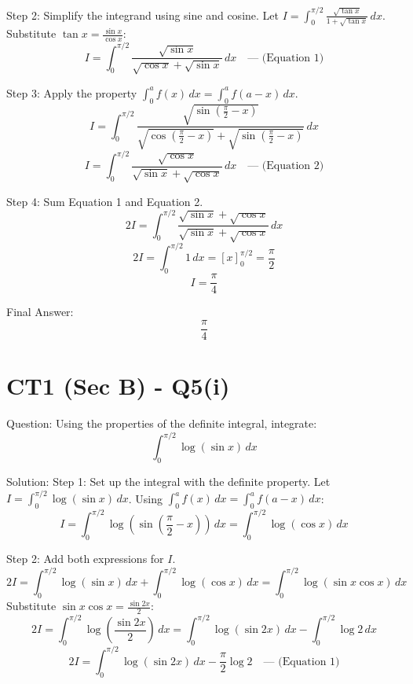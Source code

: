 \documentclass{article}
\begin{document}
Step 2: Simplify the integrand using sine and cosine.
Let \(I = \int_0^{\pi/2} \frac{\sqrt{\tan x}}{1 + \sqrt{\tan x}} \, dx\).
Substitute \(\tan x = \frac{\sin x}{\cos x}\):
\[
I = \int_0^{\pi/2} \frac{\sqrt{\sin x}}{\sqrt{\cos x} + \sqrt{\sin x}} \, dx \quad \text{--- (Equation 1)}
\]

Step 3: Apply the property \(\int_0^a f(x) \, dx = \int_0^a f(a-x) \, dx\).
\[
I = \int_0^{\pi/2} \frac{\sqrt{\sin\left(\frac{\pi}{2}-x\right)}}{\sqrt{\cos\left(\frac{\pi}{2}-x\right)} + \sqrt{\sin\left(\frac{\pi}{2}-x\right)}} \, dx
\]
\[
I = \int_0^{\pi/2} \frac{\sqrt{\cos x}}{\sqrt{\sin x} + \sqrt{\cos x}} \, dx \quad \text{--- (Equation 2)}
\]

Step 4: Sum Equation 1 and Equation 2.
\[
2I = \int_0^{\pi/2} \frac{\sqrt{\sin x} + \sqrt{\cos x}}{\sqrt{\sin x} + \sqrt{\cos x}} \, dx
\]
\[
2I = \int_0^{\pi/2} 1 \, dx = \left[ x \right]_0^{\pi/2} = \frac{\pi}{2}
\]
\[
I = \frac{\pi}{4}
\]

Final Answer:
\[
\boxed{\frac{\pi}{4}}
\]

\section*{CT1 (Sec B) - Q5(i)}
Question:
Using the properties of the definite integral, integrate:
\[
\int_0^{\pi/2} \log(\sin x) \, dx
\]

Solution:
Step 1: Set up the integral with the definite property.
Let \(I = \int_0^{\pi/2} \log(\sin x) \, dx\).
Using \(\int_0^a f(x) \, dx = \int_0^a f(a-x) \, dx\):
\[
I = \int_0^{\pi/2} \log\left(\sin\left(\frac{\pi}{2}-x\right)\right) \, dx = \int_0^{\pi/2} \log(\cos x) \, dx
\]

Step 2: Add both expressions for \(I\).
\[
2I = \int_0^{\pi/2} \log(\sin x) \, dx + \int_0^{\pi/2} \log(\cos x) \, dx = \int_0^{\pi/2} \log(\sin x \cos x) \, dx
\]
Substitute \(\sin x \cos x = \frac{\sin 2x}{2}\):
\[
2I = \int_0^{\pi/2} \log\left(\frac{\sin 2x}{2}\right) \, dx = \int_0^{\pi/2} \log(\sin 2x) \, dx - \int_0^{\pi/2} \log 2 \, dx
\]
\[
2I = \int_0^{\pi/2} \log(\sin 2x) \, dx - \frac{\pi}{2}\log 2 \quad \text{--- (Equation 1)}
\]
\end{document}
